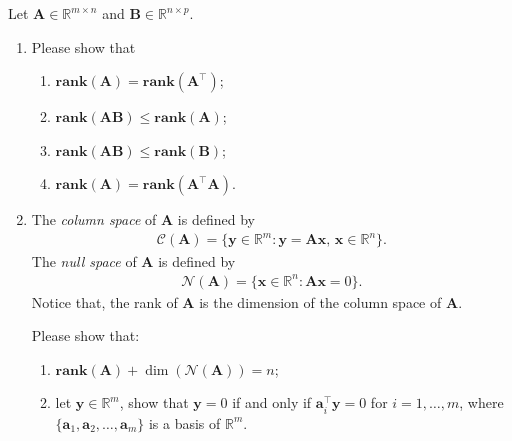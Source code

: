 \documentclass[11pt,letter,notitlepage]{article}
\newcommand{\rank}[1]{ \textbf{rank}  (#1)  }
\begin{document}
\begin{exercise}
	Let $\mathbf{A} \in \mathbb{R}^{m\times n}$ and $\mathbf{B}\in \mathbb{R}^{n\times p}$.
	\begin{enumerate}
	    \item Please show that
            \begin{enumerate}
                \item $\rank{\mathbf{A}} = \rank{\mathbf{A}^{\top}}$;
                \item $\rank{\mathbf{A}\mathbf{B}} \leq \rank{\mathbf{A}}$;
                \item $\rank{\mathbf{A}\mathbf{B}} \leq \rank{\mathbf{B}}$;
                \item $\rank{\mathbf{A}} = \rank{\mathbf{A}^{\top}  \mathbf{A}}$.
            \end{enumerate}
        \item The \emph{column space} of $\mathbf{A}$ is defined by
                \begin{align*}
                    \mathcal{C}(\mathbf{A} ) = \{ \mathbf{y}\in \mathbb{R}^m : \mathbf{y} = \mathbf{Ax},\,\mathbf{x}\in\mathbb{R}^n\}.
                \end{align*}
                The \emph{null space} of $\mathbf{A}$ is defined by
                \begin{align*}
                    \mathcal{N}(\mathbf{A})  = \{ \mathbf{x}\in \mathbb{R}^n : \mathbf{Ax}=0\}.
                \end{align*}
                Notice that, the rank of $\mathbf{A}$ is the dimension of the column space of $\mathbf{A}$.
                
                Please show that:
	               \begin{enumerate}
                	    \item $\rank{\mathbf{A}} + \dim ( \mathcal{N}( \mathbf{A} ) ) = n$;
                	    \item let $\mathbf{y}\in \mathbb{R}^m$, show that $\mathbf{y}=0$ if and only if $\mathbf{a}_i^{\top}\mathbf{y}=0$ for $i=1,\ldots,m$, where $\{\mathbf{a}_1,\mathbf{a}_2,\ldots,\mathbf{a}_m\}$ is a basis of $\mathbb{R}^m$.
                	\end{enumerate}    
	\end{enumerate}
\end{exercise}
\end{document}
